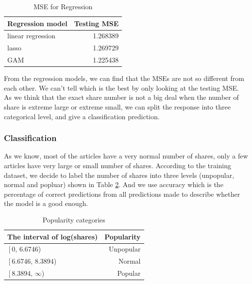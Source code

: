 \documentclass[11pt]{article}
\begin{document}
    \begin{table}[h]
        \centering
        \caption{MSE for Regression}
        \begin{tabular}{ l | r }
            \hline\hline
            Regression model & Testing MSE\\
            \hline
            linear regression & 1.268389 \\
            lasso & 1.269729 \\
            GAM & 1.225438 \\
            \hline\hline
        \end{tabular}
        \label{table:1}
    \end{table}

From the regression models, we can find that the MSEs are not so different from each other. We can't tell which is the best by only looking at the testing MSE. As we think that the exact share number is not a big deal when the number of share is extreme large or extreme small, we can split the response into three categorical level, and give a classification prediction.

\subsubsection{Classification}
As we know, most of the articles have a very normal number of shares, only a few articles have very large or small number of shares. According to the training dataset, we decide to label the number of shares into three levels (unpopular, normal and popluar) shown in Table \ref{table:Popularity}. And we use accuracy which is the percentage of correct predictions from all predictions made to describe whether the model is a good enough. \\
    \begin{table}[h]
        \centering
        \caption{Popularity categories}
        \begin{tabular}{ l | r }
            \hline\hline
            The interval of log(shares) & Popularity\\
            \hline
            $\left[$0, 6.6746) & Unpopular \\
            $\left[$6.6746, 8.3894) & Normal \\
            $\left[$8.3894, $\infty$) & Popular \\
            \hline\hline
        \end{tabular}
        \label{table:Popularity}
    \end{table}
\end{document}
